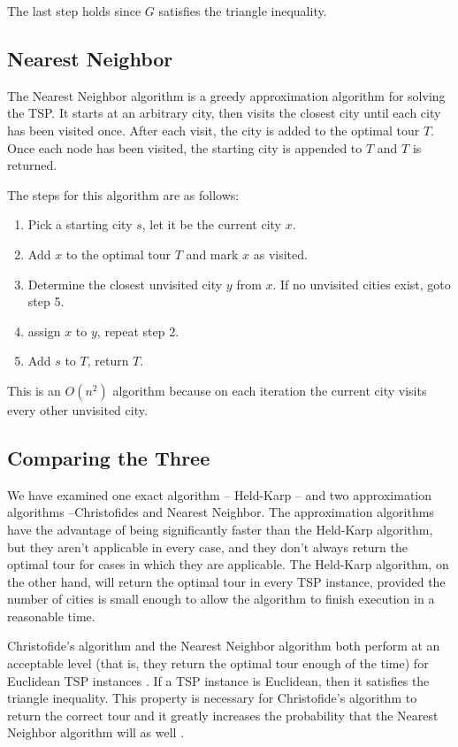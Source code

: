 \documentclass[11pt,fleqn]{article}
\begin{document}
The last step holds since $G$ satisfies the triangle inequality. \cite{nicos}

\subsection{Nearest Neighbor}
The Nearest Neighbor algorithm is a greedy approximation algorithm
for solving the TSP\@.  It starts at an arbitrary city, then visits
the closest city until each city has been visited once.  After each
visit, the city is added to the optimal tour $T$.  Once each node
has been visited, the starting city is appended to $T$ and $T$ is
returned. \cite{bellmore}
\par

The steps for this algorithm are as follows:
\begin{enumerate}
  \item Pick a starting city $s$, let it be the current city $x$.
  \item Add $x$ to the optimal tour $T$ and mark $x$ as visited.
  \item Determine the closest unvisited city $y$ from $x$.  If no
    unvisited cities exist, goto step 5.
  \item assign $x$ to $y$, repeat step 2.
  \item Add $s$ to $T$, return $T$.
\end{enumerate}

This is an $O(n^2)$ algorithm because on each iteration the
current city visits every other unvisited city.

\subsection{Comparing the Three}
We have examined one exact algorithm -- Held-Karp -- and two approximation
algorithms --Christofides and Nearest Neighbor.  The approximation algorithms
have the advantage of being significantly faster than the Held-Karp algorithm,
but they aren't applicable in every case, and they don't always return the optimal
tour for cases in which they are applicable.  The Held-Karp algorithm, on the other
hand, will return the optimal tour in every TSP instance, provided the number of
cities is small enough to allow the algorithm to finish execution in a reasonable
time.
\par

Christofide's algorithm and the Nearest Neighbor algorithm both perform at an
acceptable level (that is, they return the optimal tour enough of the time) for
Euclidean TSP instances \cite{gutin}.  If a TSP instance is Euclidean, then it satisfies the
triangle inequality.  This property is necessary for Christofide's algorithm to
return the correct tour \cite{nicos} and it greatly increases the probability
that the Nearest Neighbor algorithm will as well \cite{gutin}.
\par
\end{document}

